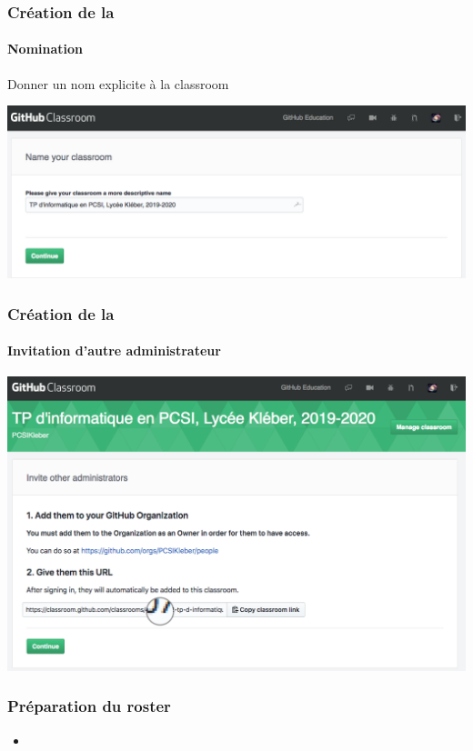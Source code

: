 \begin{frame}
	\frametitle{Création de la }
	\framesubtitle{Nomination}

	Donner un nom explicite à la classroom

	\begin{center}
		\includegraphics[width=\linewidth]{figures/classroom_naming.png}
	\end{center}

\end{frame}

\begin{frame}
	\frametitle{Création de la }
	\framesubtitle{Invitation d'autre administrateur}


	\begin{center}
		\includegraphics[width=\linewidth]{figures/classroom_invite_admin.png}
	\end{center}

\end{frame}


\begin{frame}
\frametitle{Préparation du roster}

\begin{itemize}
	\item	<1->
\end{itemize}

\end{frame}
